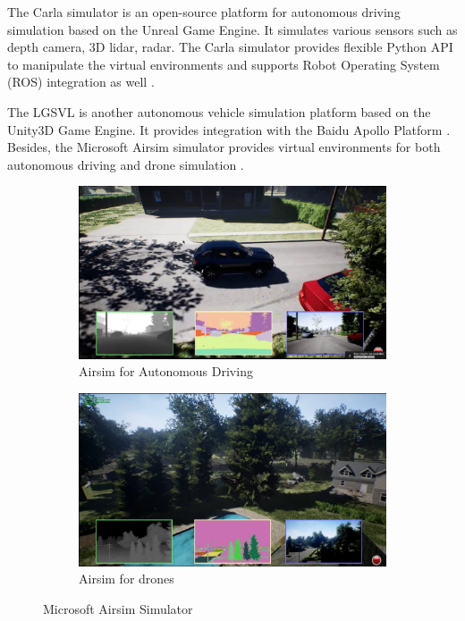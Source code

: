 The Carla simulator is an open-source platform for autonomous driving simulation based on the Unreal Game Engine. It simulates various sensors such as depth camera, 3D lidar, radar. The Carla simulator provides flexible Python API to manipulate the virtual environments and supports Robot Operating System (ROS) integration as well \cite{Dosovitskiy17}.

The LGSVL is another autonomous vehicle simulation platform based on the Unity3D Game Engine. It provides integration with the Baidu Apollo Platform \cite{rong2020lgsvl}. Besides, the Microsoft Airsim simulator provides virtual environments for both autonomous driving and drone simulation \cite{airsim2017fsr}.

\begin{figure}[H]
\centering
\begin{subfigure}[b]{0.485\textwidth}
    \centering
    \includegraphics[width=\textwidth]{figures/chapter_intro/airsim_car.jpg}
    \caption{Airsim for Autonomous Driving}
    \label{fig:airsim_car}
\end{subfigure}
\hfill
\begin{subfigure}[b]{0.485\textwidth}
    \centering
    \includegraphics[width=\textwidth]{figures/chapter_intro/airsim_drone.jpg}
    \caption{Airsim for drones}
    \label{fig:airsim_drone}
\end{subfigure}
\hfill
\caption{Microsoft Airsim Simulator}
\label{fig.airsim}
\end{figure}

